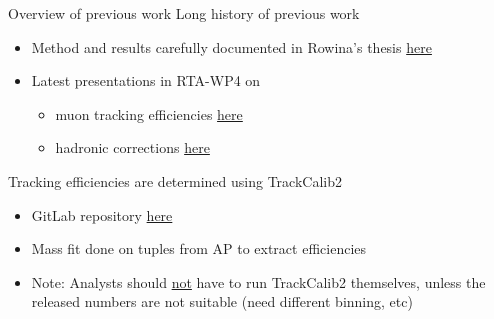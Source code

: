 \documentclass[xcolor={dvipsnames}]{beamer}
\begin{document}
\begin{frame}{Overview of previous work}
  \vspace{0.0cm}
  {Long history of previous work}
  \vspace{0.2cm}
  \begin{itemize}
    \setlength\itemsep{1.0em}
    \item{Method and results carefully documented in Rowina's thesis \href{https://repository.cern/records/n2g9v-81z15}{here}}
    \item{Latest presentations in RTA-WP4 on}
    \begin{itemize}
      \item[-]{muon tracking efficiencies \href{https://indico.cern.ch/event/1577595/\#4-update-track-reconstruction}{here}}
      \item[-]{hadronic corrections \href{https://indico.cern.ch/event/1577599/\#3-hadronic-tracking-uncertaint}{here}}
    \end{itemize}
  \end{itemize}
  \vspace{0.5cm}
  {Tracking efficiencies are determined using TrackCalib2}
  \vspace{0.2cm}
  \begin{itemize}
    \setlength\itemsep{0.8em}
    \item{GitLab repository \href{https://gitlab.cern.ch/lhcb-rta/trackcalib2}{here}}
    \item{Mass fit done on tuples from AP to extract efficiencies}
    \item{Note: Analysts should \underline{not} have to run TrackCalib2 themselves, unless the released numbers are not suitable (need different binning, etc)}
  \end{itemize}
\end{frame}
\end{document}
